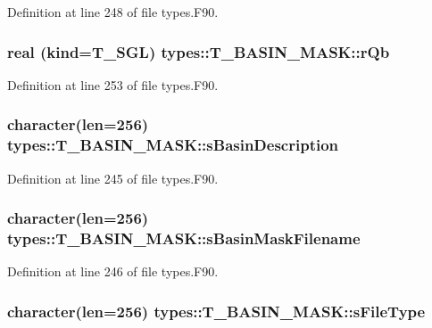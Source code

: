Definition at line 248 of file types.F90.

\hypertarget{typetypes_1_1_t___b_a_s_i_n___m_a_s_k_a77d01ae3382fc6a95ac1dbae506f1b5e}{
\subsubsection[{rQb}]{\setlength{\rightskip}{0pt plus 5cm}real (kind={\bf T\_\-SGL}) {\bf types::T\_\-BASIN\_\-MASK::rQb}}}
\label{typetypes_1_1_t___b_a_s_i_n___m_a_s_k_a77d01ae3382fc6a95ac1dbae506f1b5e}


Definition at line 253 of file types.F90.

\hypertarget{typetypes_1_1_t___b_a_s_i_n___m_a_s_k_a7d23e472e9bdf341e272b8c4e0135a70}{
\subsubsection[{sBasinDescription}]{\setlength{\rightskip}{0pt plus 5cm}character(len=256) {\bf types::T\_\-BASIN\_\-MASK::sBasinDescription}}}
\label{typetypes_1_1_t___b_a_s_i_n___m_a_s_k_a7d23e472e9bdf341e272b8c4e0135a70}


Definition at line 245 of file types.F90.

\hypertarget{typetypes_1_1_t___b_a_s_i_n___m_a_s_k_a68b9d791a32a3ce32d2dad4dd8973b72}{
\subsubsection[{sBasinMaskFilename}]{\setlength{\rightskip}{0pt plus 5cm}character(len=256) {\bf types::T\_\-BASIN\_\-MASK::sBasinMaskFilename}}}
\label{typetypes_1_1_t___b_a_s_i_n___m_a_s_k_a68b9d791a32a3ce32d2dad4dd8973b72}


Definition at line 246 of file types.F90.

\hypertarget{typetypes_1_1_t___b_a_s_i_n___m_a_s_k_ae0103cba824946fdc8f8c2c5965351a5}{
\subsubsection[{sFileType}]{\setlength{\rightskip}{0pt plus 5cm}character(len=256) {\bf types::T\_\-BASIN\_\-MASK::sFileType}}}
\label{typetypes_1_1_t___b_a_s_i_n___m_a_s_k_ae0103cba824946fdc8f8c2c5965351a5}


